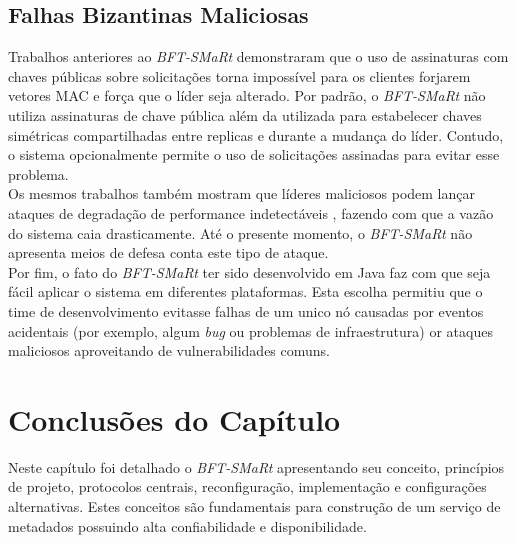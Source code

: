 	 	\subsection{Falhas Bizantinas Maliciosas}
	 	Trabalhos anteriores ao \textit{BFT-SMaRt} demonstraram que o uso de assinaturas com chaves públicas sobre solicitações torna impossível para os clientes forjarem vetores MAC e força que o líder seja alterado. Por padrão, o \textit{BFT-SMaRt} não utiliza assinaturas de chave pública além da utilizada para estabelecer chaves simétricas compartilhadas entre replicas e durante a mudança do líder. Contudo, o sistema opcionalmente permite o uso de solicitações assinadas para evitar esse problema.\\
	 	
	 	Os mesmos trabalhos também mostram que líderes maliciosos podem lançar ataques de degradação de performance indetectáveis , fazendo com que a vazão do sistema caia drasticamente. Até o presente momento, o \textit{BFT-SMaRt} não apresenta meios de defesa conta este tipo de ataque. \\
	 	
	 	Por fim, o fato do \textit{BFT-SMaRt} ter sido desenvolvido em Java faz com que seja fácil aplicar o sistema em diferentes plataformas. Esta escolha permitiu que o time de desenvolvimento evitasse falhas de um unico nó causadas por eventos acidentais (por exemplo, algum \textit{bug} ou problemas de infraestrutura) or ataques maliciosos aproveitando de vulnerabilidades comuns.  \\
	   
	
		
		\section{Conclusões do Capítulo}
	Neste capítulo foi detalhado o \textit{BFT-SMaRt} apresentando seu conceito, princípios de projeto, protocolos centrais, reconfiguração, implementação e configurações alternativas.
	Estes conceitos são fundamentais para construção de um serviço de metadados possuindo alta confiabilidade e disponibilidade. 
	